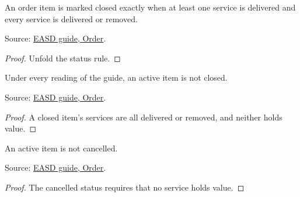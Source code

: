 \begin{theorem}
  \label{thm:one-item-closed}
  An order item is marked closed exactly when at least one service is
  delivered and every service is delivered or removed.

  Source: \href{https://standards.atlassian.net/wiki/spaces/EASD/pages/574849062/Order}{EASD guide, Order}.
\end{theorem}
\begin{proof}
  Unfold the status rule.
\end{proof}

\begin{theorem}
  \label{thm:one-active-not-closed}
  Under every reading of the guide, an active item is not closed.

  Source: \href{https://standards.atlassian.net/wiki/spaces/EASD/pages/574849062/Order}{EASD guide, Order}.
\end{theorem}
\begin{proof}
  A closed item's services are all delivered or removed, and neither holds
  value.
\end{proof}

\begin{theorem}
  \label{thm:one-active-not-cancelled}
  An active item is not cancelled.

  Source: \href{https://standards.atlassian.net/wiki/spaces/EASD/pages/574849062/Order}{EASD guide, Order}.
\end{theorem}
\begin{proof}
  The cancelled status requires that no service holds value.
\end{proof}

